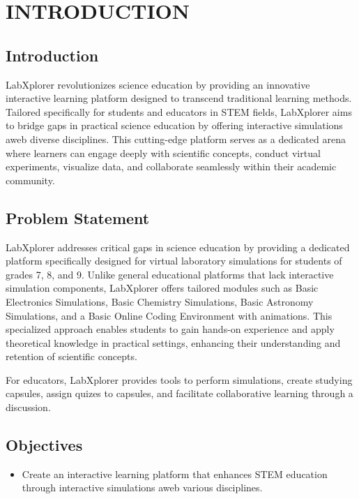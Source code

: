 \chapter{INTRODUCTION}



\section{Introduction}
LabXplorer revolutionizes science education by providing an innovative interactive learning platform designed to transcend traditional learning methods. Tailored specifically for students and educators in STEM fields, LabXplorer aims to bridge gaps in practical science education by offering interactive simulations aweb diverse disciplines. This cutting-edge platform serves as a dedicated arena where learners can engage deeply with scientific concepts, conduct virtual experiments, visualize data, and collaborate seamlessly within their academic community.


\section{Problem Statement }
LabXplorer addresses critical gaps in science education by providing a dedicated platform specifically designed for virtual laboratory simulations for students of grades 7, 8, and 9. Unlike general educational platforms that lack interactive simulation components, LabXplorer offers tailored modules such as Basic Electronics Simulations, Basic Chemistry Simulations, Basic Astronomy Simulations, and a Basic Online Coding Environment with animations. This specialized approach enables students to gain hands-on experience and apply theoretical knowledge in practical settings, enhancing their understanding and retention of scientific concepts.

For educators, LabXplorer provides tools to perform simulations, create studying capsules, assign quizes to capsules, and facilitate collaborative learning through a discussion. 
\section{Objectives}
\begin{itemize}
    \item Create an interactive learning platform that enhances STEM education through interactive simulations aweb various disciplines.
\end{itemize}
